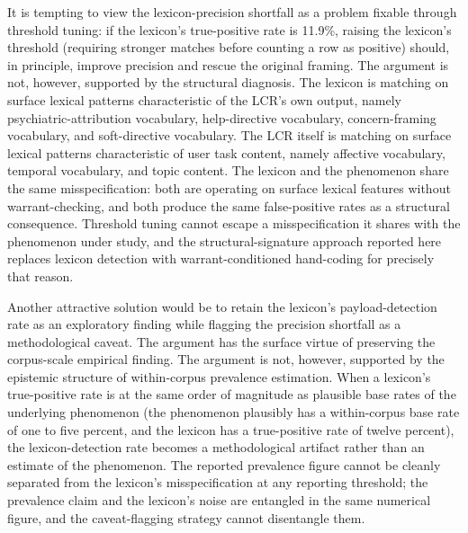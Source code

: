 \documentclass[11pt]{article}
\begin{document}
It is tempting to view the lexicon-precision shortfall as a problem fixable through threshold tuning: if the lexicon's true-positive rate is 11.9\%, raising the lexicon's threshold (requiring stronger matches before counting a row as positive) should, in principle, improve precision and rescue the original framing. The argument is not, however, supported by the structural diagnosis. The lexicon is matching on surface lexical patterns characteristic of the LCR's own output, namely psychiatric-attribution vocabulary, help-directive vocabulary, concern-framing vocabulary, and soft-directive vocabulary. The LCR itself is matching on surface lexical patterns characteristic of user task content, namely affective vocabulary, temporal vocabulary, and topic content. The lexicon and the phenomenon share the same misspecification: both are operating on surface lexical features without warrant-checking, and both produce the same false-positive rates as a structural consequence. Threshold tuning cannot escape a misspecification it shares with the phenomenon under study, and the structural-signature approach reported here replaces lexicon detection with warrant-conditioned hand-coding for precisely that reason.

Another attractive solution would be to retain the lexicon's payload-detection rate as an exploratory finding while flagging the precision shortfall as a methodological caveat. The argument has the surface virtue of preserving the corpus-scale empirical finding. The argument is not, however, supported by the epistemic structure of within-corpus prevalence estimation. When a lexicon's true-positive rate is at the same order of magnitude as plausible base rates of the underlying phenomenon (the phenomenon plausibly has a within-corpus base rate of one to five percent, and the lexicon has a true-positive rate of twelve percent), the lexicon-detection rate becomes a methodological artifact rather than an estimate of the phenomenon. The reported prevalence figure cannot be cleanly separated from the lexicon's misspecification at any reporting threshold; the prevalence claim and the lexicon's noise are entangled in the same numerical figure, and the caveat-flagging strategy cannot disentangle them.
\end{document}
